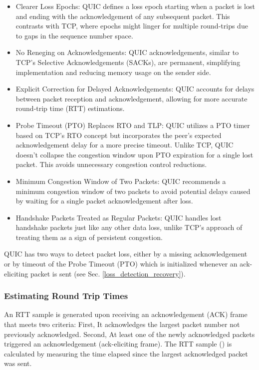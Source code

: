 \begin{itemize}
    \item Clearer Loss Epochs: QUIC defines a loss epoch starting when a packet is lost and ending with the acknowledgement of any subsequent
    packet. This contrasts with TCP, where epochs might linger for multiple round-trips due to gaps in the sequence number space.
    \item No Reneging on Acknowledgements: QUIC acknowledgements, similar to TCP's Selective Acknowledgements (SACKs), are permanent, simplifying
    implementation and reducing memory usage on the sender side.
    \item Explicit Correction for Delayed Acknowledgements: QUIC accounts for delays between packet reception and acknowledgement, allowing for
    more accurate round-trip time (RTT) estimations.
    \item Probe Timeout (PTO) Replaces RTO and TLP: QUIC utilizes a PTO timer based on TCP's RTO concept but incorporates the peer's expected
    acknowledgement delay for a more precise timeout. Unlike TCP, QUIC doesn't collapse the congestion window upon PTO expiration for a
    single lost packet. This avoids unnecessary congestion control reductions.
    \item Minimum Congestion Window of Two Packets: QUIC recommends a minimum congestion window of two packets to avoid potential delays caused
    by waiting for a single packet acknowledgement after loss.
    \item Handshake Packets Treated as Regular Packets: QUIC handles lost handshake packets just like any other data loss, unlike TCP's approach
    of treating them as a sign of persistent congestion.
\end{itemize}

QUIC has two ways to detect packet loss, either by a missing acknowledgement or by timeout of the Probe Timeout (PTO) which is initialized
whenever an ack-eliciting packet is sent (see Sec. \ref{loss_detection_recovery}).

\subsubsection{Estimating Round Trip Times}

An RTT sample is generated upon receiving an acknowledgement (ACK) frame that meets two criteria:
First, It acknowledges the largest packet number not previously acknowledged.
Second, At least one of the newly acknowledged packets triggered an acknowledgement (ack-eliciting frame).
The RTT sample () is calculated by measuring the time elapsed since the largest acknowledged packet was sent.

